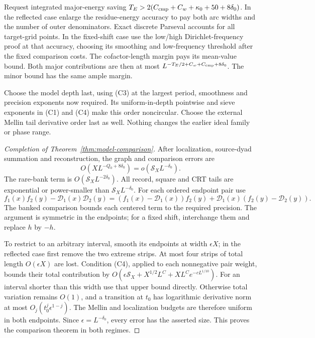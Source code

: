 Request integrated major-energy saving
\(T_E>2(C_{\rm cmp}+C_w+\kappa_0+50+8\delta_0)\).
In the reflected case enlarge the residue-energy accuracy to pay
both arc widths and the number of outer denominators. Exact discrete
Parseval accounts for all target-grid points. In the fixed-shift case
use the low/high Dirichlet-frequency proof at that accuracy, choosing
its smoothing and low-frequency threshold after the fixed comparison
costs. The cofactor-length margin pays its mean-value bound.
Both major contributions are then at most
\(L^{-T_E/2+C_w+C_{\rm cmp}+8\delta_0}\).
The minor bound has the same ample margin.

Choose the model depth last, using (C3) at the largest period,
smoothness and precision exponents now required. Its uniform-in-depth
pointwise and sieve exponents in (C1) and (C4) make this order
noncircular. Choose the external Mellin tail derivative order last
as well. Nothing changes the earlier ideal family or phase range.

\begin{proof}[Completion of Theorem~\ref{thm:model-comparison}]
After localization, source-dyad summation and reconstruction, the graph
and comparison errors are
\[
 O(XL^{-Q_0+8\delta_0})=o(\mathcal S_XL^{-\delta_0}).
\]
The rare-bank term is \(O(\mathcal S_XL^{-2\delta_0})\).
All record, square and CRT tails are exponential or power-smaller
than \(\mathcal S_XL^{-\delta_0}\).
For each ordered endpoint pair use
\[
 f_1(x)f_2(y)-\mathcal D_1(x)\mathcal D_2(y)
 =(f_1(x)-\mathcal D_1(x))f_2(y)+\mathcal D_1(x)(f_2(y)-\mathcal D_2(y)).
\]
The banked comparison bounds each centered term to the required
precision. The argument is symmetric in the endpoints; for a fixed
shift, interchange them and replace \(h\) by \(-h\).

To restrict to an arbitrary interval, smooth its endpoints at width
\(\epsilon X\); in the reflected case first remove the two extreme
strips. At most four strips of total length \(O(\epsilon X)\)
are lost. Condition (C4), applied to each nonnegative pair weight,
bounds their total contribution by
\(O(\epsilon\mathcal S_X+X^{1/2}L^C+XL^Ce^{-cL^{1/10}})\).
For an interval shorter than this width use that upper bound directly.
Otherwise total variation remains \(O(1)\), and a transition at
\(t_0\) has logarithmic derivative norm at most
\(O_j(t_0^j\epsilon^{1-j})\). The Mellin and localization budgets
are therefore uniform in both endpoints. Since
\(\epsilon=L^{-\delta_0}\), every error has the asserted size.
This proves the comparison theorem in both regimes.
\end{proof}

